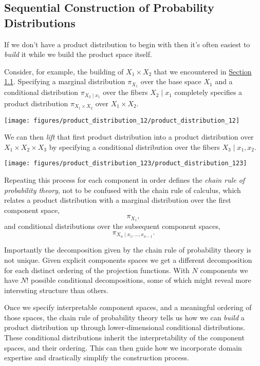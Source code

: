 \documentclass[]{article}
\begin{document}
\hypertarget{sequential-construction-of-probability-distributions}{%
\subsection{Sequential Construction of Probability
Distributions}\label{sequential-construction-of-probability-distributions}}

If we don't have a product distribution to begin with then it's often
easiest to \emph{build} it while we build the product space itself.

Consider, for example, the building of \(X_{1} \times X_{2}\) that we
encountered in \protect\hyperlink{sec:building_product_spaces}{Section
1.1}. Specifying a marginal distribution \(\pi_{X_{1}}\) over the base
space \(X_{1}\) and a conditional distribution
\(\pi_{X_{2} \mid x_{1}}\) over the fibers \(X_{2} \mid x_{1}\)
completely specifies a product distribution \(\pi_{X_{1} \times X_{2}}\)
over \(X_{1} \times X_{2}\).

\texttt{[image: figures/product\_distribution\_12/product\_distribution\_12]}

We can then \emph{lift} that first product distribution into a product
distribution over \(X_{1} \times X_{2} \times X_{3}\) by specifying a
conditional distribution over the fibers \(X_{3} \mid x_{1}, x_{2}\).

\texttt{[image: figures/product\_distribution\_123/product\_distribution\_123]}

Repeating this process for each component in order defines the
\emph{chain rule of probability theory}, not to be confused with the
chain rule of calculus, which relates a product distribution with a
marginal distribution over the first component space, \[
\pi_{X_{1}},
\] and conditional distributions over the subsequent component spaces,
\[
\pi_{ X_{n} \mid x_{1}, \ldots, x_{n - 1} }.
\]

Importantly the decomposition given by the chain rule of probability
theory is not unique. Given explicit components spaces we get a
different decomposition for each distinct ordering of the projection
functions. With \(N\) components we have \(N!\) possible conditional
decompositions, some of which might reveal more interesting structure
than others.

Once we specify interpretable component spaces, and a meaningful
ordering of those spaces, the chain rule of probability theory tells us
how we can \emph{build} a product distribution up through
lower-dimensional conditional distributions. These conditional
distributions inherit the interpretability of the component spaces, and
their ordering. This can then guide how we incorporate domain expertise
and drastically simplify the construction process.
\end{document}
